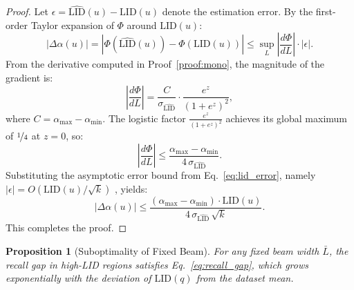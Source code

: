 \documentclass{article}
\theoremstyle{plain}
\newtheorem{proposition}[theorem]{Proposition}
\theoremstyle{definition}
\theoremstyle{remark}
\begin{document}
\begin{proof}
Let $\epsilon = \widehat{\mathrm{LID}}(u) - \mathrm{LID}(u)$
denote the estimation error. By the first-order Taylor expansion
of $\Phi$ around $\mathrm{LID}(u)$:
\begin{equation}
    |\Delta\alpha(u)| =
    \left|\Phi\!\left(\widehat{\mathrm{LID}}(u)\right)
    - \Phi\!\left(\mathrm{LID}(u)\right)\right|
    \leq \sup_L\left|\frac{d\Phi}{dL}\right| \cdot |\epsilon|.
\end{equation}
From the derivative computed in Proof~\ref{proof:mono}, the
magnitude of the gradient is:
\begin{equation}
    \left|\frac{d\Phi}{dL}\right| =
    \frac{C}{\sigma_{\widehat{\mathrm{LID}}}} \cdot
    \frac{e^z}{(1+e^z)^2},
\end{equation}
where $C = \alpha_{\max} - \alpha_{\min}$. The logistic factor
$\frac{e^z}{(1+e^z)^2}$ achieves its global maximum of
$\nicefrac{1}{4}$ at $z = 0$, so:
\begin{equation}
    \left|\frac{d\Phi}{dL}\right| \leq
    \frac{\alpha_{\max} - \alpha_{\min}}{4\,\sigma_{\widehat{\mathrm{LID}}}}.
\end{equation}
Substituting the asymptotic error bound from
Eq.~\eqref{eq:lid_error}, namely
$|\epsilon| = O(\mathrm{LID}(u)/\sqrt{k})$
\cite{NIPS2004_74934548}, yields:
\begin{equation}
    |\Delta\alpha(u)| \leq
    \frac{(\alpha_{\max} - \alpha_{\min}) \cdot \mathrm{LID}(u)}
         {4\,\sigma_{\widehat{\mathrm{LID}}}\,\sqrt{k}}.
\end{equation}
This completes the proof.
\end{proof}

\begin{proposition}[Suboptimality of Fixed Beam]
\label{proof:fixed_beam}
For any fixed beam width $\bar{L}$, the recall gap in high-LID
regions satisfies Eq.~\eqref{eq:recall_gap}, which grows
exponentially with the deviation of $\mathrm{LID}(q)$ from
the dataset mean.
\end{proposition}
\end{document}

